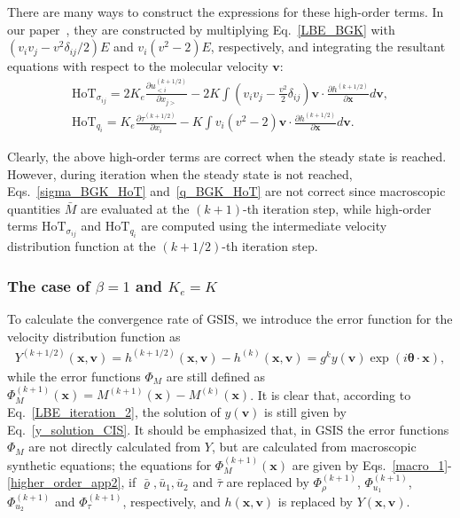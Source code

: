 There are many ways to construct the expressions for these high-order terms. In our  paper~\cite{SuArXiv2019}, they are constructed by multiplying Eq.~\eqref{LBE_BGK} with $\left(v_iv_j-{v^2}\delta_{ij}/2\right)E$ and ${v_i}\left(v^2-2\right)E$, respectively, and integrating the resultant equations with respect to the molecular velocity $\bm{v}$: 
\begin{eqnarray}
\text{HoT}_{\sigma_{ij}}=2K_e\frac{\partial u^{(k+1/2)}_{<i}}{\partial {x_{j>}}}-2K\int{\left(v_iv_j-\frac{v^2}{2}\delta_{ij}\right)}\bm{v}\cdot\frac{\partial{} h^{(k+1/2)}}{\partial\bm{x}}d\bm{v}, \label{higher_order_app1}\\
\text{HoT}_{q_i} =K_e\frac{\partial \tau^{(k+1/2)}}{\partial x_i}-K\int{v_i(v^2-2)}\bm{v}\cdot\frac{\partial{} h^{(k+1/2)}}{\partial\bm{x}}d\bm{v}. \label{higher_order_app2}
\end{eqnarray}



Clearly, the above high-order terms are correct when the steady state is reached. However, during iteration when the steady state is not reached, Eqs.~\eqref{sigma_BGK_HoT} and~\eqref{q_BGK_HoT} are not correct since macroscopic quantities $\bar{M}$ are evaluated at the $(k+1)$-th iteration step, while high-order terms $\text{HoT}_{\sigma_{ij}}$ and $\text{HoT}_{q_i}$ are computed using the intermediate velocity distribution function at the $(k+1/2)$-th iteration step. %




\subsubsection{The case of $\beta=1$ and $K_e=K$} To calculate the convergence rate of GSIS, we introduce the error function for the velocity distribution function as
\begin{eqnarray}
Y^{(k+1/2)}(\bm{x},\bm{v})=h^{(k+1/2)}(\bm{x},\bm{v})-h^{(k)}(\bm{x},\bm{v})={g}^{k}y(\bm{v})\exp(i\bm{\theta}\cdot{\bm{x}}),\label{Y_ansatz2} 
\end{eqnarray}
while the error functions $\Phi_M$ are still defined as $\Phi^{(k+1)}_M(\bm{x})=M^{(k+1)}(\bm{x})-M^{(k)}(\bm{x})$. It is clear that, according to Eq.~\eqref{LBE_iteration_2}, the solution of $y(\bm{v})$ is still given by Eq.~\eqref{y_solution_CIS}. It should be emphasized that, in GSIS the error functions $\Phi_M$ are not directly calculated from $Y$, but are calculated from macroscopic synthetic equations; the equations for $\Phi^{(k+1)}_M(\bm{x})$ are given by Eqs.~\eqref{macro_1}-\eqref{higher_order_app2}, if $\bar{\varrho},\bar{u}_1,\bar{u}_2$ and $\bar{\tau}$ are replaced by $\Phi_\rho^{(k+1)}$, $\Phi_{u_1}^{(k+1)}$, $\Phi_{u_2}^{(k+1)}$ and $\Phi_\tau^{(k+1)}$, respectively, and $h(\bm{x},\bm{v})$ is replaced by $Y(\bm{x},\bm{v})$.  


